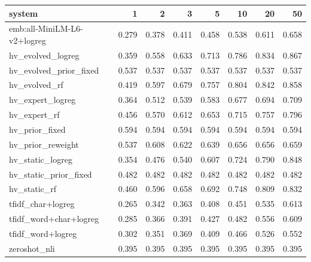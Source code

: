 \begin{tabular}{lrrrrrrr}
\toprule
system & 1 & 2 & 3 & 5 & 10 & 20 & 50 \\
\midrule
emb:all-MiniLM-L6-v2+logreg & 0.279 & 0.378 & 0.411 & 0.458 & 0.538 & 0.611 & 0.658 \\
hv\_evolved\_logreg & 0.359 & 0.558 & 0.633 & 0.713 & 0.786 & 0.834 & 0.867 \\
hv\_evolved\_prior\_fixed & 0.537 & 0.537 & 0.537 & 0.537 & 0.537 & 0.537 & 0.537 \\
hv\_evolved\_rf & 0.419 & 0.597 & 0.679 & 0.757 & 0.804 & 0.842 & 0.858 \\
hv\_expert\_logreg & 0.364 & 0.512 & 0.539 & 0.583 & 0.677 & 0.694 & 0.709 \\
hv\_expert\_rf & 0.456 & 0.570 & 0.612 & 0.653 & 0.715 & 0.757 & 0.796 \\
hv\_prior\_fixed & 0.594 & 0.594 & 0.594 & 0.594 & 0.594 & 0.594 & 0.594 \\
hv\_prior\_reweight & 0.537 & 0.608 & 0.622 & 0.639 & 0.656 & 0.656 & 0.659 \\
hv\_static\_logreg & 0.354 & 0.476 & 0.540 & 0.607 & 0.724 & 0.790 & 0.848 \\
hv\_static\_prior\_fixed & 0.482 & 0.482 & 0.482 & 0.482 & 0.482 & 0.482 & 0.482 \\
hv\_static\_rf & 0.460 & 0.596 & 0.658 & 0.692 & 0.748 & 0.809 & 0.832 \\
tfidf\_char+logreg & 0.265 & 0.342 & 0.363 & 0.408 & 0.451 & 0.535 & 0.613 \\
tfidf\_word+char+logreg & 0.285 & 0.366 & 0.391 & 0.427 & 0.482 & 0.556 & 0.609 \\
tfidf\_word+logreg & 0.302 & 0.351 & 0.369 & 0.409 & 0.466 & 0.526 & 0.552 \\
zeroshot\_nli & 0.395 & 0.395 & 0.395 & 0.395 & 0.395 & 0.395 & 0.395 \\
\bottomrule
\end{tabular}

